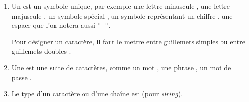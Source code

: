 \documentclass[11pt,class=report,crop=false]{standalone}
\begin{document}
\newcommand{\badletter}[1]{\underline{\textcolor{red}{#1}}}










\begin{cours}
\sauteligne
\begin{enumerate}
  \item Un  est un symbole unique, par exemple une lettre minuscule , une lettre majuscule , un symbole spécial , un symbole représentant un chiffre , une espace  que l'on notera aussi \lstinline[showstringspaces=true]!" "!.
  
Pour désigner un caractère, il faut le mettre entre guillemets simples  ou entre guillemets doubles .
  
  \item Une  est une suite de caractères, comme un mot , une phrase , un mot de passe \codeinline{"N[w5ms\}e!"}.
  
  \item Le type d'un caractère ou d'une chaîne est  (pour \emph{string}).
  

\end{enumerate}  
\end{cours}


\end{document}
